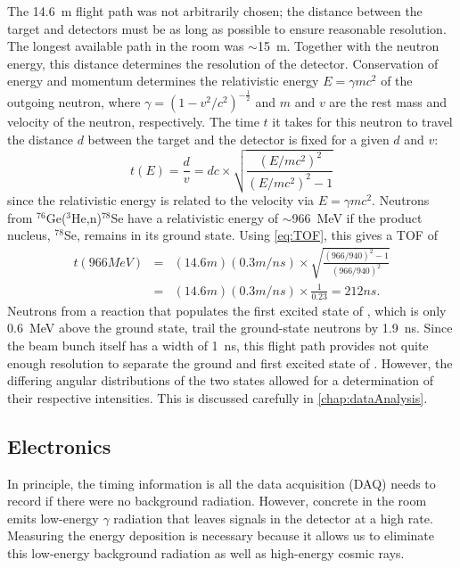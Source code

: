 The 14.6~m flight path was not arbitrarily chosen; the distance between the target and detectors must be as long as possible to ensure reasonable resolution.  The longest available path in the room was $\sim$15~m.  Together with the neutron energy, this distance determines the resolution of the detector.  Conservation of energy and momentum determines the relativistic energy $E = \gamma m c^2$ of the outgoing neutron, where $\gamma=(1-v^2/c^2)^{-\frac{1}{2}}$ and $m$ and $v$ are the rest mass and velocity of the neutron, respectively.  The time $t$ it takes for this neutron to travel the distance $d$ between the target and the detector is fixed for a given $d$ and $v$:
\begin{equation}
t(E) = \frac{d}{v} =  dc\times\sqrt{\frac{(E/mc^2)^2}{(E/mc^2)^2-1}} 
\label{eq:TOF}
\end{equation}
since the relativistic energy is related to the velocity via $E=\gamma mc^2$.  Neutrons from $^{76}$Ge($^3$He,n)$^{78}$Se have a relativistic energy of $\sim$966~MeV if the product nucleus, $^{78}$Se, remains in its ground state.  Using \eqn \ref{eq:TOF}, this gives a TOF of
\begin{eqnarray}
t(966 MeV) &=& (14.6 m)(0.3 m/ns)\times\sqrt{\frac{(966/940)^2-1}{(966/940)^2}} \nonumber \\
           &=& (14.6 m)(0.3 m/ns)\times\frac{1}{0.23} = 212 ns \nonumber.
\end{eqnarray}
Neutrons from a reaction that populates the first excited state of , which is only 0.6~MeV above the ground state, trail the ground-state neutrons by 1.9~ns.  Since the beam bunch itself has a width of 1~ns, this flight path provides not quite enough resolution to separate the ground and first excited state of \GeTargets. However, the differing angular distributions of the two states allowed for a determination of their respective intensities.  This is discussed carefully in \ref{chap:dataAnalysis}.


\subsection{Electronics}
\label{sec:electronics}

In principle, the timing information is all the data acquisition (DAQ) needs to record if there were no background radiation.  However, concrete in the room emits low-energy $\gamma$ radiation that leaves signals in the detector at a high rate.  Measuring the energy deposition is necessary because it allows us to eliminate this low-energy background radiation as well as high-energy cosmic rays.

